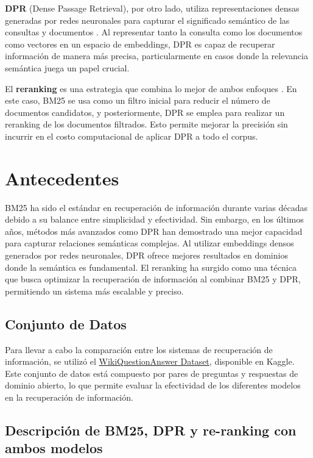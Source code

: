 \documentclass[runningheads]{llncs}
\begin{document}
\textbf{DPR} (Dense Passage Retrieval), por otro lado, utiliza representaciones densas generadas por redes neuronales para capturar el significado semántico de las consultas y documentos \cite{dpr}. Al representar tanto la consulta como los documentos como vectores en un espacio de embeddings, DPR es capaz de recuperar información de manera más precisa, particularmente en casos donde la relevancia semántica juega un papel crucial.

El \textbf{reranking} es una estrategia que combina lo mejor de ambos enfoques \cite{reranking}. En este caso, BM25 se usa como un filtro inicial para reducir el número de documentos candidatos, y posteriormente, DPR se emplea para realizar un reranking de los documentos filtrados. Esto permite mejorar la precisión sin incurrir en el costo computacional de aplicar DPR a todo el corpus.

\section{Antecedentes}
BM25 ha sido el estándar en recuperación de información durante varias décadas debido a su balance entre simplicidad y efectividad. Sin embargo, en los últimos años, métodos más avanzados como DPR han demostrado una mejor capacidad para capturar relaciones semánticas complejas. Al utilizar embeddings densos generados por redes neuronales, DPR ofrece mejores resultados en dominios donde la semántica es fundamental. El reranking ha surgido como una técnica que busca optimizar la recuperación de información al combinar BM25 y DPR, permitiendo un sistema más escalable y preciso.
\subsection{Conjunto de Datos}
Para llevar a cabo la comparación entre los sistemas de recuperación de información, se utilizó el \href{https://www.kaggle.com/datasets/thedevastator/wikiquestionanswer-a-dataset-for-open-domain-que}{WikiQuestionAnswer Dataset}, disponible en Kaggle. Este conjunto de datos está compuesto por pares de preguntas y respuestas de dominio abierto, lo que permite evaluar la efectividad de los diferentes modelos en la recuperación de información.

\subsection{Descripción de BM25, DPR y re-ranking con ambos modelos}
\end{document}
